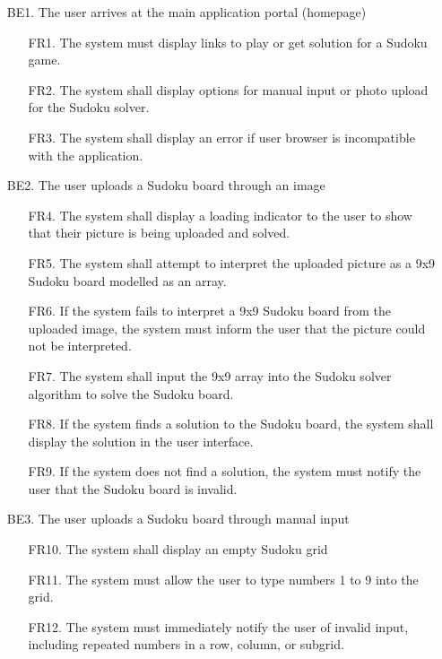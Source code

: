 \documentclass[11pt]{article}
\begin{document}
\begin{enumerate}
    \item [BE1.] The user arrives at the main application portal (homepage)
    \begin{enumerate}
        \item [FR1.] The system must display links to play or get solution for a Sudoku game.
        \item [FR2.] The system shall display options for manual input or photo upload for the Sudoku solver.
        \item [FR3.] The system shall display an error if user browser is incompatible with the application.
    \end{enumerate}
    \item [BE2.] The user uploads a Sudoku board through an image
    \begin{enumerate}
        \item [FR4.] The system shall display a loading indicator to the user to show that their picture is being uploaded and solved.
        \item [FR5.] The system shall attempt to interpret the uploaded picture as a 9x9 Sudoku board modelled as an array.
        \item [FR6.] If the system fails to interpret a 9x9 Sudoku board from the uploaded image, the system must inform the user that the picture could not be interpreted.
        \item [FR7.] The system shall input the 9x9 array into the Sudoku solver algorithm to solve the Sudoku board.
        \item [FR8.] If the system finds a solution to the Sudoku board, the system shall display the solution in the user interface.
        \item [FR9.] If the system does not find a solution, the system must notify the user that the Sudoku board is invalid.
    \end{enumerate}
    \item [BE3.] The user uploads a Sudoku board through manual input
    \begin{enumerate}
        \item [FR10.] The system shall display an empty Sudoku grid
        \item [FR11.] The system must allow the user to type numbers 1 to 9 into the grid.
        \item [FR12.] The system must immediately notify the user of invalid input, including repeated numbers in a row, column, or subgrid.

\end{enumerate}
\end{enumerate}
\end{document}
